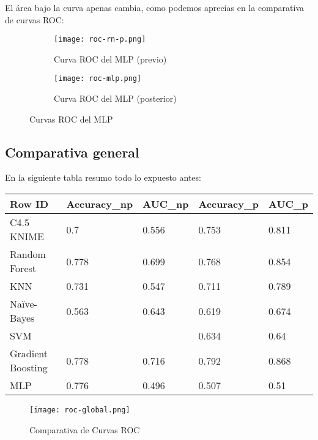 El área bajo la curva apenas cambia, como podemos aprecias en la comparativa de curvas ROC:

\begin{figure}[H]
	\begin{subfigure}{.5\textwidth}
		\centering
		\texttt{[image: roc-rn-p.png]}
		\caption{Curva ROC del MLP (previo)}
		\label{fig:rcmlpp}
	\end{subfigure}%
	\begin{subfigure}{.5\textwidth}
		\centering
		\texttt{[image: roc-mlp.png]}
		\caption{Curva ROC del MLP (posterior)}
		\label{fig:rcmlp}
	\end{subfigure}
	\caption{Curvas ROC del MLP}
	\label{fig:mlp}
\end{figure}

\subsection{Comparativa general}

En la siguiente tabla resumo todo lo expuesto antes:

\begin{table}[H]
	\centering
	\begin{tabular}{|l|l|l|l|l|}
		\hline
		Row ID            & Accuracy\_np & AUC\_np & Accuracy\_p & AUC\_p   \\ \hline
		C4.5 KNIME        & 0.7         & 0.556  & 0.753    & 0.811 \\ \hline
		Random Forest     & 0.778       & 0.699  & 0.768    & 0.854 \\ \hline
		KNN               & 0.731       & 0.547  & 0.711    & 0.789 \\ \hline
		Naïve-Bayes       & 0.563       & 0.643  & 0.619    & 0.674 \\ \hline
		SVM               &             &        & 0.634    & 0.64  \\ \hline
		Gradient Boosting & 0.778       & 0.716  & 0.792    & 0.868 \\ \hline
		MLP               & 0.776       & 0.496  & 0.507    & 0.51  \\ \hline
	\end{tabular}
\end{table}

\begin{figure}[H] %
	\centering
	\texttt{[image: roc-global.png]}  %
	\caption{Comparativa de Curvas ROC} 
	\label{fig:rocglobal}
\end{figure}

